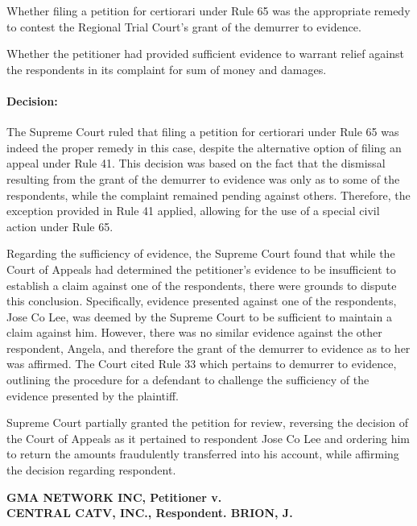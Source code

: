 \documentclass[
12pt,
oneside,
onehalfspacing,
headsepline
]{DigestCollection}
\begin{document}
Whether filing a petition for certiorari under Rule 65 was the appropriate remedy to contest the Regional Trial Court's grant of the demurrer to evidence.

Whether the petitioner had provided sufficient evidence to warrant relief against the respondents in its complaint for sum of money and damages.

\paragraph{Decision:}
\label{4093ee90-1213-11ef-aa24-9916ea601717}


The Supreme Court ruled that filing a petition for certiorari under Rule 65 was indeed the proper remedy in this case, despite the alternative option of filing an appeal under Rule 41. This decision was based on the fact that the dismissal resulting from the grant of the demurrer to evidence was only as to some of the respondents, while the complaint remained pending against others. Therefore, the exception provided in Rule 41 applied, allowing for the use of a special civil action under Rule 65.

Regarding the sufficiency of evidence, the Supreme Court found that while the Court of Appeals had determined the petitioner's evidence to be insufficient to establish a claim against one of the respondents, there were grounds to dispute this conclusion. Specifically, evidence presented against one of the respondents, Jose Co Lee, was deemed by the Supreme Court to be sufficient to maintain a claim against him. However, there was no similar evidence against the other respondent, Angela, and therefore the grant of the demurrer to evidence as to her was affirmed. The Court cited Rule 33 which pertains to demurrer to evidence, outlining the procedure for a defendant to challenge the sufficiency of the evidence presented by the plaintiff.

Supreme Court partially granted the petition for review, reversing the decision of the Court of Appeals as it pertained to respondent Jose Co Lee and ordering him to return the amounts fraudulently transferred into his account, while affirming the decision regarding respondent.

\label{2e6deed0-0a2c-11ef-a1a5-03b0bde1fccf}


\noindent\textbf{GMA NETWORK INC, Petitioner v. \\CENTRAL CATV, INC., Respondent. BRION, J.}\vspace{0.4cm}
\end{document}
